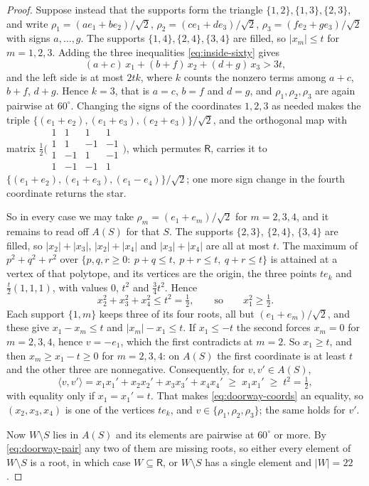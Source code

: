 \documentclass[11pt,reqno]{amsart}
\renewcommand{\_}{\origunderscore\allowbreak}
\numberwithin{equation}{section}
\theoremstyle{plain}
\theoremstyle{definition}
\theoremstyle{remark}
\newcommand{\Rt}{\mathsf{R}}                 %
\begin{document}
\begin{proof}
Suppose instead that the supports form the triangle
$\{1,2\},\{1,3\},\{2,3\}$, and write
$\rho_1=(ae_1+be_2)/\sqrt2$, $\rho_2=(ce_1+de_3)/\sqrt2$,
$\rho_3=(fe_2+ge_3)/\sqrt2$ with signs $a,\dots,g$. The supports
$\{1,4\},\{2,4\},\{3,4\}$ are filled, so $|x_m|\le t$ for $m=1,2,3$.
Adding the three inequalities \eqref{eq:inside-sixty} gives
\[
  (a+c)\,x_1+(b+f)\,x_2+(d+g)\,x_3>3t ,
\]
and the left side is at most $2tk$, where $k$ counts the nonzero terms
among $a+c$, $b+f$, $d+g$. Hence $k=3$, that is $a=c$, $b=f$ and $d=g$,
and $\rho_1,\rho_2,\rho_3$ are again pairwise at $60^\circ$. Changing the
signs of the coordinates $1,2,3$ as needed makes the triple
$\{(e_1+e_2),(e_1+e_3),(e_2+e_3)\}/\sqrt2$, and the orthogonal map with
matrix $\tfrac12\bigl(\begin{smallmatrix}1&1&1&1\\1&1&-1&-1\\
1&-1&1&-1\\1&-1&-1&1\end{smallmatrix}\bigr)$, which permutes $\Rt$,
carries it to $\{(e_1+e_2),(e_1+e_3),(e_1-e_4)\}/\sqrt2$; one more sign
change in the fourth coordinate returns the star.

So in every case we may take $\rho_m=(e_1+e_m)/\sqrt2$ for $m=2,3,4$, and
it remains to read off $A(S)$ for that $S$. The supports $\{2,3\}$,
$\{2,4\}$, $\{3,4\}$ are filled, so $|x_2|+|x_3|$, $|x_2|+|x_4|$ and
$|x_3|+|x_4|$ are all at most $t$. The maximum of $p^2+q^2+r^2$ over
$\{p,q,r\ge0:\ p+q\le t,\ p+r\le t,\ q+r\le t\}$ is attained at a vertex
of that polytope, and its vertices are the origin, the three points
$te_k$ and $\tfrac t2(1,1,1)$, with values $0$, $t^2$ and $\tfrac34t^2$.
Hence
\begin{equation}\label{eq:doorway-coords}
  x_2^2+x_3^2+x_4^2\le t^2=\tfrac12,
  \qquad\text{so}\qquad
  x_1^2\ge\tfrac12 .
\end{equation}
Each support $\{1,m\}$ keeps three of its four roots, all but
$(e_1+e_m)/\sqrt2$, and these give $x_1-x_m\le t$ and $|x_m|-x_1\le t$.
If $x_1\le-t$ the second forces $x_m=0$ for $m=2,3,4$, hence $v=-e_1$,
which the first contradicts at $m=2$. So $x_1\ge t$, and then
$x_m\ge x_1-t\ge0$ for $m=2,3,4$: on $A(S)$ the first coordinate is at
least $t$ and the other three are nonnegative. Consequently, for
$v,v'\in A(S)$,
\begin{equation}\label{eq:doorway-pair}
  \langle v,v'\rangle=x_1x_1'+x_2x_2'+x_3x_3'+x_4x_4'
  \;\ge\;x_1x_1'\;\ge\;t^2=\tfrac12 ,
\end{equation}
with equality only if $x_1=x_1'=t$. That makes
\eqref{eq:doorway-coords} an equality, so $(x_2,x_3,x_4)$ is one of the
vertices $te_k$, and $v\in\{\rho_1,\rho_2,\rho_3\}$; the same holds for
$v'$.

Now $W\setminus S$ lies in $A(S)$ and its elements are pairwise at
$60^\circ$ or more. By \eqref{eq:doorway-pair} any two of them are
missing roots, so either every element of $W\setminus S$ is a root, in
which case $W\subseteq\Rt$, or $W\setminus S$ has a single element and
$|W|=22$.
\end{proof}
\end{document}

